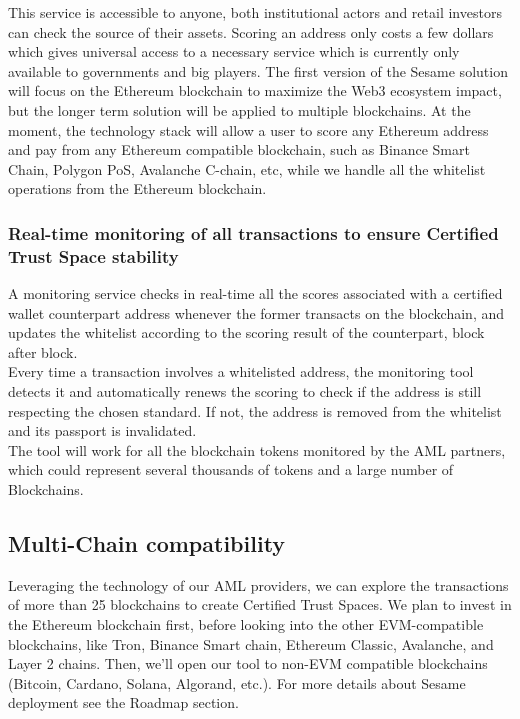 ﻿\documentclass[a4paper]{article}
\let\OldTexttrademark\texttrademark
\renewcommand{\texttrademark}{\OldTexttrademark\xspace}%
\begin{document}
This service is accessible to anyone, both institutional actors and retail investors can check the source of their assets. Scoring an address only costs a few dollars which gives universal access to a necessary service which is currently only available to governments and big players. The first version of the Sesame solution will focus on the Ethereum blockchain to maximize the Web3 ecosystem impact, but the longer term solution will be applied to multiple blockchains. At the moment, the technology stack will allow a user to score any Ethereum address and pay from any Ethereum compatible blockchain, such as Binance Smart Chain, Polygon PoS, Avalanche C-chain, etc, while we handle all the whitelist operations from the Ethereum blockchain. 

\subsubsection{Real-time monitoring of all transactions to ensure Certified Trust Space\texttrademark stability} 
A monitoring service checks in real-time all the scores associated with a certified wallet counterpart address whenever the former transacts on the blockchain, and updates the whitelist according to the scoring result of the counterpart, block after block. \\

Every time a transaction involves a whitelisted address, the monitoring tool detects it and automatically renews the scoring to check if the address is still respecting the chosen standard. If not, the address is removed from the whitelist and its passport is invalidated. \\

The tool will work for all the blockchain tokens monitored by the AML partners, which could represent several thousands of tokens and a large number  of Blockchains.
\subsection{Multi-Chain compatibility} 
Leveraging the technology of our AML providers, we can explore the transactions of more than 25 blockchains to create Certified Trust Spaces\OldTexttrademark. We plan to invest in the Ethereum blockchain first, before looking into the other EVM-compatible blockchains, like Tron, Binance Smart chain, Ethereum Classic, Avalanche, and Layer 2 chains. Then, we’ll open our tool to non-EVM compatible blockchains (Bitcoin, Cardano, Solana, Algorand, etc.). For more details about Sesame deployment see the Roadmap section. 
\end{document}
